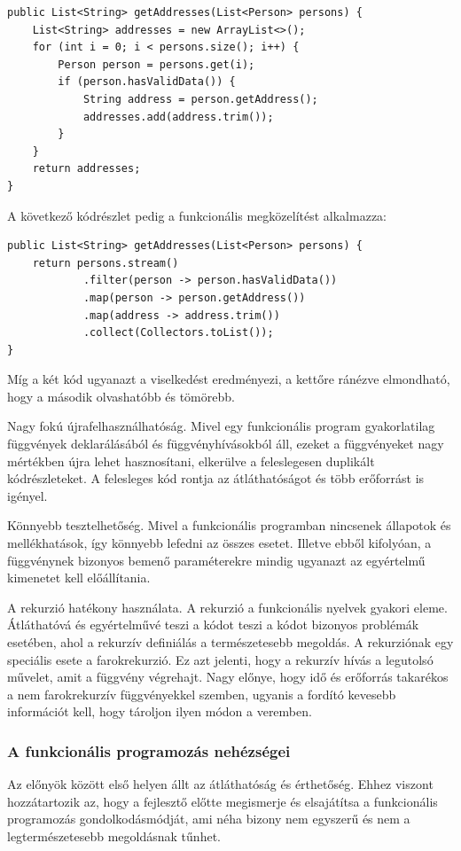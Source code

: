 \documentclass[12pt]{article}
\begin{document}
\begin{verbatim}
public List<String> getAddresses(List<Person> persons) {
    List<String> addresses = new ArrayList<>();
    for (int i = 0; i < persons.size(); i++) {
        Person person = persons.get(i);
        if (person.hasValidData()) {
            String address = person.getAddress();
            addresses.add(address.trim());
        }
    }
    return addresses;
}
\end{verbatim}
A következő kódrészlet pedig a funkcionális megközelítést alkalmazza:
\begin{verbatim}
public List<String> getAddresses(List<Person> persons) {
    return persons.stream()
            .filter(person -> person.hasValidData())
            .map(person -> person.getAddress())
            .map(address -> address.trim())
            .collect(Collectors.toList());
}
\end{verbatim}
Míg a két kód ugyanazt a viselkedést eredményezi, a kettőre ránézve elmondható, hogy a második olvashatóbb és tömörebb.

Nagy fokú újrafelhasználhatóság. Mivel egy funkcionális program gyakorlatilag függvények deklarálásából és függvényhívásokból áll, ezeket a függvényeket nagy mértékben újra lehet hasznosítani, elkerülve a feleslegesen duplikált kódrészleteket. A felesleges kód rontja az átláthatóságot és több erőforrást is igényel.

Könnyebb tesztelhetőség. Mivel a funkcionális programban nincsenek állapotok és mellékhatások, így könnyebb lefedni az összes esetet. Illetve ebből kifolyóan, a függvénynek bizonyos bemenő paraméterekre mindig ugyanazt az egyértelmű kimenetet kell előállítania.

A rekurzió hatékony használata. A rekurzió a funkcionális nyelvek gyakori eleme. Átláthatóvá és egyértelművé teszi a kódot teszi a kódot bizonyos problémák esetében, ahol a rekurzív definiálás a természetesebb megoldás. A rekurziónak egy speciális esete a farokrekurzió. Ez azt jelenti, hogy a rekurzív hívás a legutolsó művelet, amit a függvény végrehajt. Nagy előnye, hogy idő és erőforrás takarékos a nem farokrekurzív függvényekkel szemben, ugyanis a fordító kevesebb információt kell, hogy tároljon ilyen módon a veremben.

\subsubsection{A funkcionális programozás nehézségei}

Az előnyök között első helyen állt az átláthatóság és érthetőség. Ehhez viszont hozzátartozik az, hogy a fejlesztő előtte megismerje és elsajátítsa a funkcionális programozás gondolkodásmódját, ami néha bizony nem egyszerű és nem a legtermészetesebb megoldásnak tűnhet.
\end{document}
